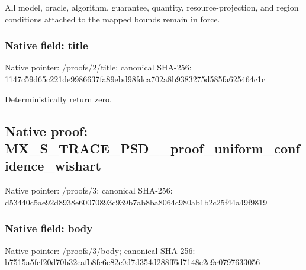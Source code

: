 \documentclass[10pt,a4paper]{article}
\begin{document}
\begingroup\raggedright\sloppy All model,\allowbreak{} oracle,\allowbreak{} algorithm,\allowbreak{} guarantee,\allowbreak{} quantity,\allowbreak{} resource-projection,\allowbreak{} and region conditions attached to the mapped bounds remain in force.\par\endgroup

\subsubsection{Native field: title}
Native pointer: /proofs/2/title; canonical SHA-256: 1147c59d65c221de9986637fa89ebd98fdca702a8b9383275d585fa625464c1c

\begingroup\raggedright\sloppy Deterministically return zero.\par\endgroup

\subsection{Native proof: MX\_\allowbreak{}S\_\allowbreak{}TRACE\_\allowbreak{}PSD\_\allowbreak{}\_\allowbreak{}proof\_\allowbreak{}uniform\_\allowbreak{}confidence\_\allowbreak{}wishart}
Native pointer: /proofs/3; canonical SHA-256: d53440c5ae92d8938e60070893c939b7ab8ba8064c980ab1b2c25f44a49f9819

\subsubsection{Native field: body}
Native pointer: /proofs/3/body; canonical SHA-256: b7515a5fcf20d70b32eafb8fc6c82c0d7d354d288ff6d7148e2e9e0797633056
\end{document}
